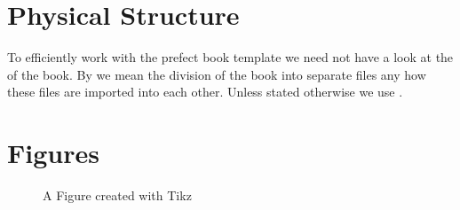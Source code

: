 \documentclass[crop=false,class=scrbook]{standalone}
\begin{document}
\section{Physical Structure}
To efficiently work with the prefect book template we need not have a look at
the  of the book.
By  we mean the division of the book into separate files any how these
files are imported into each other.
Unless stated otherwise we use .

\section{Figures}
\begin{figure}
	
	\caption{A Figure created with Tikz}
	\label{fig:figure1}
\end{figure}
\end{document}

